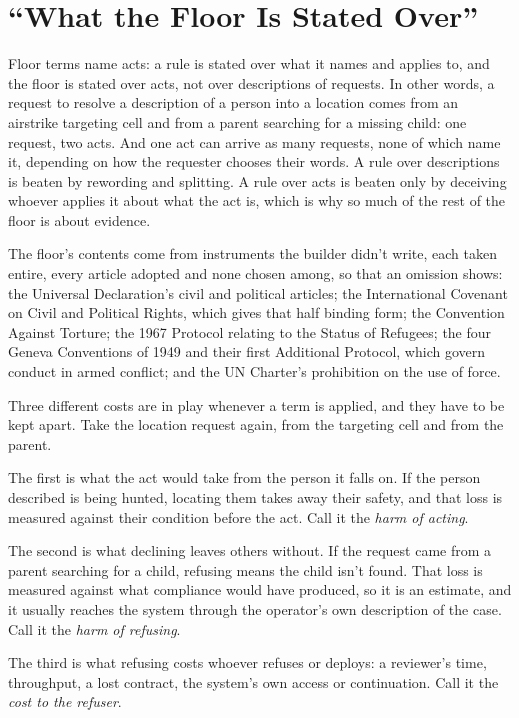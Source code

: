 \chapter{“What the Floor Is Stated Over”}
\label{sec:5}
Floor terms name acts: a rule is stated over what it names and applies to, and the floor is stated over acts, not over descriptions of requests. In other words, a request to resolve a description of a person into a location comes from an airstrike targeting cell and from a parent searching for a missing child: one request, two acts. And one act can arrive as many requests, none of which name it, depending on how the requester chooses their words. A rule over descriptions is beaten by rewording and splitting. A rule over acts is beaten only by deceiving whoever applies it about what the act is, which is why so much of the rest of the floor is about evidence.

The floor's contents come from instruments the builder didn't write, each taken entire, every article adopted and none chosen among, so that an omission shows: the Universal Declaration's civil and political articles; the International Covenant on Civil and Political Rights, which gives that half binding form; the Convention Against Torture; the 1967 Protocol relating to the Status of Refugees; the four Geneva Conventions of 1949 and their first Additional Protocol, which govern conduct in armed conflict; and the UN Charter's prohibition on the use of force.

Three different costs are in play whenever a term is applied, and they have to be kept apart. Take the location request again, from the targeting cell and from the parent.

The first is what the act would take from the person it falls on. If the person described is being hunted, locating them takes away their safety, and that loss is measured against their condition before the act. Call it the \emph{harm of acting}.

The second is what declining leaves others without. If the request came from a parent searching for a child, refusing means the child isn't found. That loss is measured against what compliance would have produced, so it is an estimate, and it usually reaches the system through the operator's own description of the case. Call it the \emph{harm of refusing}.

The third is what refusing costs whoever refuses or deploys: a reviewer's time, throughput, a lost contract, the system's own access or continuation. Call it the \emph{cost to the refuser}.

